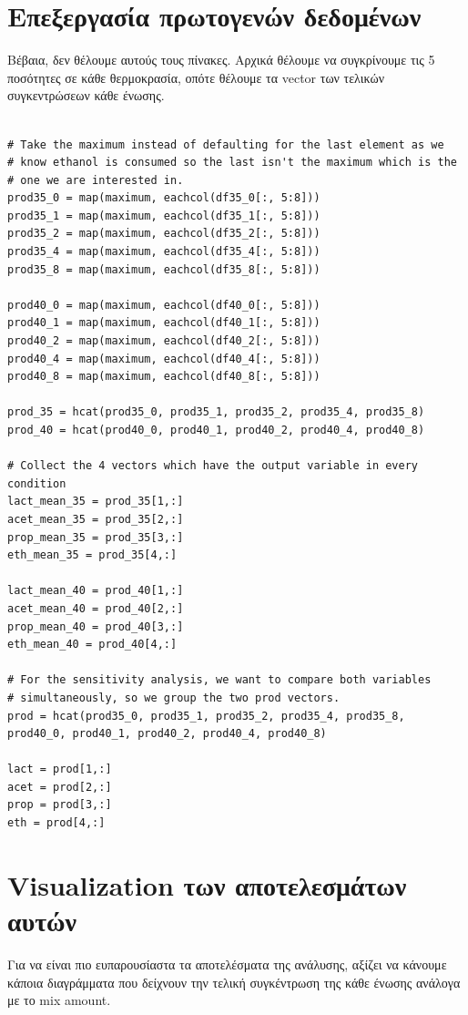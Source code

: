 \documentclass[11pt]{article}
\begin{document}
\section{Επεξεργασία πρωτογενών δεδομένων}
\label{sec:orgfcc97f9}
Βέβαια, δεν θέλουμε αυτούς τους πίνακες. Αρχικά θέλουμε να συγκρίνουμε τις 5 ποσότητες σε κάθε θερμοκρασία, οπότε θέλουμε τα vector των τελικών συγκεντρώσεων κάθε ένωσης.

\begin{verbatim}

# Take the maximum instead of defaulting for the last element as we
# know ethanol is consumed so the last isn't the maximum which is the
# one we are interested in.
prod35_0 = map(maximum, eachcol(df35_0[:, 5:8]))
prod35_1 = map(maximum, eachcol(df35_1[:, 5:8]))
prod35_2 = map(maximum, eachcol(df35_2[:, 5:8]))
prod35_4 = map(maximum, eachcol(df35_4[:, 5:8]))
prod35_8 = map(maximum, eachcol(df35_8[:, 5:8]))

prod40_0 = map(maximum, eachcol(df40_0[:, 5:8]))
prod40_1 = map(maximum, eachcol(df40_1[:, 5:8]))
prod40_2 = map(maximum, eachcol(df40_2[:, 5:8]))
prod40_4 = map(maximum, eachcol(df40_4[:, 5:8]))
prod40_8 = map(maximum, eachcol(df40_8[:, 5:8]))

prod_35 = hcat(prod35_0, prod35_1, prod35_2, prod35_4, prod35_8)
prod_40 = hcat(prod40_0, prod40_1, prod40_2, prod40_4, prod40_8)

# Collect the 4 vectors which have the output variable in every condition
lact_mean_35 = prod_35[1,:]
acet_mean_35 = prod_35[2,:]
prop_mean_35 = prod_35[3,:]
eth_mean_35 = prod_35[4,:]

lact_mean_40 = prod_40[1,:]
acet_mean_40 = prod_40[2,:]
prop_mean_40 = prod_40[3,:]
eth_mean_40 = prod_40[4,:]

# For the sensitivity analysis, we want to compare both variables
# simultaneously, so we group the two prod vectors.
prod = hcat(prod35_0, prod35_1, prod35_2, prod35_4, prod35_8, prod40_0, prod40_1, prod40_2, prod40_4, prod40_8)

lact = prod[1,:]
acet = prod[2,:]
prop = prod[3,:]
eth = prod[4,:]
\end{verbatim}

\section{Visualization των αποτελεσμάτων αυτών}
\label{sec:org8e823c0}
Για να είναι πιο ευπαρουσίαστα τα αποτελέσματα της ανάλυσης, αξίζει να κάνουμε κάποια διαγράμματα που δείχνουν την τελική συγκέντρωση της κάθε ένωσης ανάλογα με το mix amount.
\end{document}
